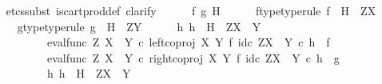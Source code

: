 \begin{isabellebody}
\ \ \isamarkupfalse%
\ {\isacharparenleft}{\kern0pt}etcs{\isacharunderscore}{\kern0pt}subst\ is{\isacharunderscore}{\kern0pt}cart{\isacharunderscore}{\kern0pt}prod{\isacharunderscore}{\kern0pt}def{}{\isacharcomma}{\kern0pt}\ clarify{\isacharparenright}{\kern0pt}\isanewline
\ \ \ \ \isamarkupfalse%
\ f\ g\ H\isanewline
\ \ \ \ \isamarkupfalse%
\ f{\isacharunderscore}{\kern0pt}type{\isacharbrackleft}{\kern0pt}type{\isacharunderscore}{\kern0pt}rule{\isacharbrackright}{\kern0pt}{\isacharcolon}{\kern0pt}\ {\isachardoublequoteopen}f\ {\isacharcolon}{\kern0pt}\ H\ {\isasymrightarrow}\ Z\isactrlbsup X\isactrlesup {\isachardoublequoteclose}\isanewline
\ \ \ \ \isamarkupfalse%
\ g{\isacharunderscore}{\kern0pt}type{\isacharbrackleft}{\kern0pt}type{\isacharunderscore}{\kern0pt}rule{\isacharbrackright}{\kern0pt}{\isacharcolon}{\kern0pt}\ {\isachardoublequoteopen}g\ {\isacharcolon}{\kern0pt}\ H\ {\isasymrightarrow}\ Z\isactrlbsup Y\isactrlesup {\isachardoublequoteclose}\isanewline
\ \ \ \ \isamarkupfalse%
\ {\isachardoublequoteopen}{\isasymexists}h{\isachardot}{\kern0pt}\ h\ {\isacharcolon}{\kern0pt}\ H\ {\isasymrightarrow}\ Z\isactrlbsup {\isacharparenleft}{\kern0pt}X\ {\isasymCoprod}\ Y{\isacharparenright}{\kern0pt}\isactrlesup \ {\isasymand}\isanewline
\ \ \ \ \ \ \ \ \ \ \ {\isacharparenleft}{\kern0pt}eval{\isacharunderscore}{\kern0pt}func\ Z\ {\isacharparenleft}{\kern0pt}X\ {\isasymCoprod}\ Y{\isacharparenright}{\kern0pt}\ {\isasymcirc}\isactrlsub c\ left{\isacharunderscore}{\kern0pt}coproj\ X\ Y\ {\isasymtimes}\isactrlsub f\ id\isactrlsub c\ {\isacharparenleft}{\kern0pt}Z\isactrlbsup {\isacharparenleft}{\kern0pt}X\ {\isasymCoprod}\ Y{\isacharparenright}{\kern0pt}\isactrlesup {\isacharparenright}{\kern0pt}{\isacharparenright}{\kern0pt}\isactrlsup {\isasymsharp}\ {\isasymcirc}\isactrlsub c\ h\ {\isacharequal}{\kern0pt}\ f\ {\isasymand}\isanewline
\ \ \ \ \ \ \ \ \ \ \ {\isacharparenleft}{\kern0pt}eval{\isacharunderscore}{\kern0pt}func\ Z\ {\isacharparenleft}{\kern0pt}X\ {\isasymCoprod}\ Y{\isacharparenright}{\kern0pt}\ {\isasymcirc}\isactrlsub c\ right{\isacharunderscore}{\kern0pt}coproj\ X\ Y\ {\isasymtimes}\isactrlsub f\ id\isactrlsub c\ {\isacharparenleft}{\kern0pt}Z\isactrlbsup {\isacharparenleft}{\kern0pt}X\ {\isasymCoprod}\ Y{\isacharparenright}{\kern0pt}\isactrlesup {\isacharparenright}{\kern0pt}{\isacharparenright}{\kern0pt}\isactrlsup {\isasymsharp}\ {\isasymcirc}\isactrlsub c\ h\ {\isacharequal}{\kern0pt}\ g\ {\isasymand}\isanewline
\ \ \ \ \ \ \ \ \ \ \ {\isacharparenleft}{\kern0pt}{\isasymforall}h{}{\isachardot}{\kern0pt}\ h{}\ {\isacharcolon}{\kern0pt}\ H\ {\isasymrightarrow}\ Z\isactrlbsup {\isacharparenleft}{\kern0pt}X\ {\isasymCoprod}\ Y{\isacharparenright}{\kern0pt}\isactrlesup \ {\isasymand}\isanewline

\end{isabellebody}
